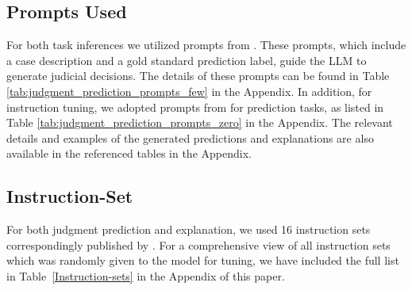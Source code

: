 \subsection{Prompts Used}
For both task inferences we utilized prompts from \cite{vats-etal-2023-llms}. These prompts, which include a case description and a gold standard prediction label, guide the LLM to generate judicial decisions. The details of these prompts can be found in Table \ref{tab:judgment_prediction_prompts_few} in the Appendix. In addition, for instruction tuning, we adopted prompts from \cite{nigam2024legaljudgmentreimaginedpredex} for prediction tasks, as listed in Table \ref{tab:judgment_prediction_prompts_zero} in the Appendix. The relevant details and examples of the generated predictions and explanations are also available in the referenced tables in the Appendix.

\subsection{Instruction-Set}
For both judgment prediction and explanation, we used 16 instruction sets correspondingly published by \cite{nigam2024legaljudgmentreimaginedpredex}. For a comprehensive view of all instruction sets which was randomly given to the model for tuning, we have included the full list in Table~\ref{Instruction-sets} in the Appendix of this paper.